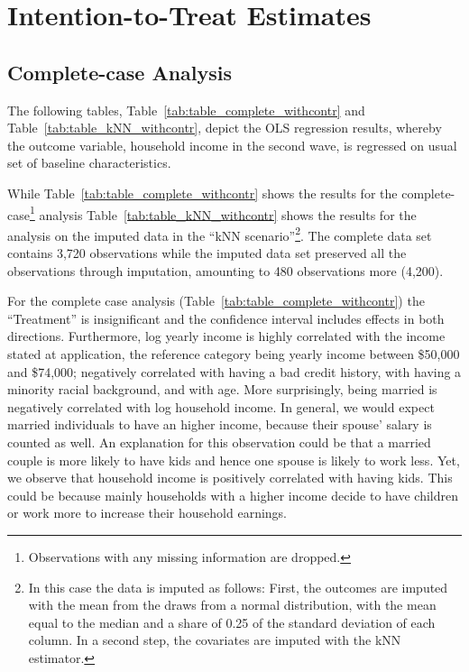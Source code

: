

\section{Intention-to-Treat Estimates}
\label{sec:itt_estimates}
\subsection{Complete-case Analysis}

The following tables, Table~\ref{tab:table_complete_withcontr} and Table~\ref{tab:table_kNN_withcontr}, depict the \ac{OLS} regression results, whereby the outcome variable, household income in the second wave, is regressed on usual set of baseline characteristics.

While Table~\ref{tab:table_complete_withcontr} shows the results for the complete-case\footnote{Observations with any missing information are dropped.} analysis Table~\ref{tab:table_kNN_withcontr} shows the results for the analysis on the imputed data in the ``\ac{kNN} scenario''\footnote{In this case the data is imputed as follows: First, the outcomes are imputed with the mean from the draws from a normal distribution, with the mean equal to the median and a share of 0.25 of the standard deviation of each column. In a second step, the covariates are imputed with the \ac{kNN} estimator.}. The complete data set contains 3,720 observations while the imputed data set preserved all the observations through imputation, amounting to 480 observations more (4,200).

For the complete case analysis (Table~\ref{tab:table_complete_withcontr}) the ``Treatment'' is insignificant and the confidence interval includes effects in both directions. Furthermore, log yearly income is highly correlated with the income stated at application, the reference category being yearly income between \$50,000 and \$74,000; negatively correlated with having a bad credit history, with having a minority racial background, and with age. More surprisingly, being married is negatively correlated with log household income. In general, we would expect married individuals to have an higher income, because their spouse' salary is counted as well. An explanation for this observation could be that a married couple is more likely to have kids and hence one spouse is likely to work less. Yet, we observe that household income is positively correlated with having kids. This could be because mainly households with a higher income decide to have children or work more to increase their household earnings.

